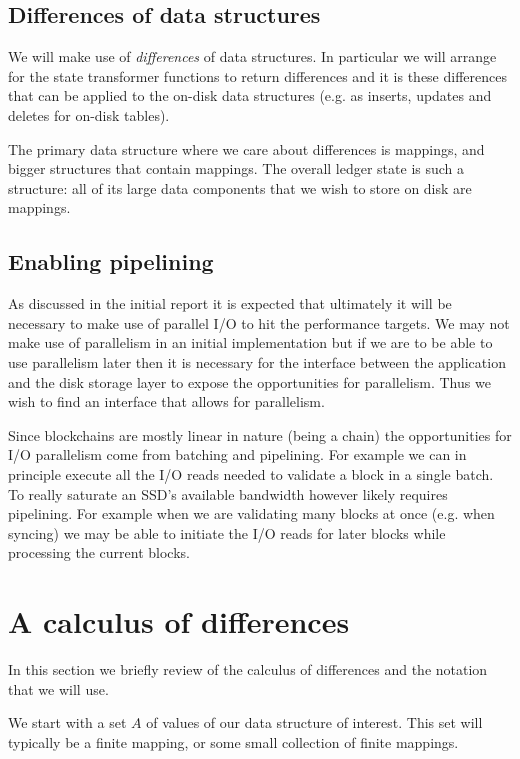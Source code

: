 \documentclass[11pt,a4paper]{article}
\begin{document}
\subsection{Differences of data structures}

We will make use of \emph{differences} of data structures. In particular
we will arrange for the state transformer functions to return differences
and it is these differences that can be applied to the on-disk data
structures (e.g. as inserts, updates and deletes for on-disk tables).

The primary data structure where we care about differences is mappings,
and bigger structures that contain mappings. The overall ledger state is
such a structure: all of its large data components that we wish to store
on disk are mappings.

\subsection{Enabling pipelining}
\label{enabling-pipelining}

As discussed in the initial report \citep[sections 6.1 and 8.8]{utxo-db} it is
expected that ultimately it will be necessary to make use of parallel I/O to
hit the performance targets. We may not make use of parallelism in an initial
implementation but if we are to be able to use parallelism later then it is
necessary for the interface between the application and the disk storage layer
to expose the opportunities for parallelism. Thus we wish to find an interface
that allows for parallelism.

Since blockchains are mostly linear in nature (being a chain) the opportunities
for I/O parallelism come from batching and pipelining. For example we can in
principle execute all the I/O reads needed to validate a block in a single
batch. To really saturate an SSD's available bandwidth however likely requires
pipelining. For example when we are validating many blocks at once (e.g. when
syncing) we may be able to initiate the I/O reads for later blocks while
processing the current blocks.


\section{A calculus of differences}
\label{calculus-differences}

In this section we briefly review of the calculus of differences and the
notation that we will use.

We start with a set $A$ of values of our data structure of interest. This set
will typically be a finite mapping, or some small collection of finite mappings.
\end{document}
